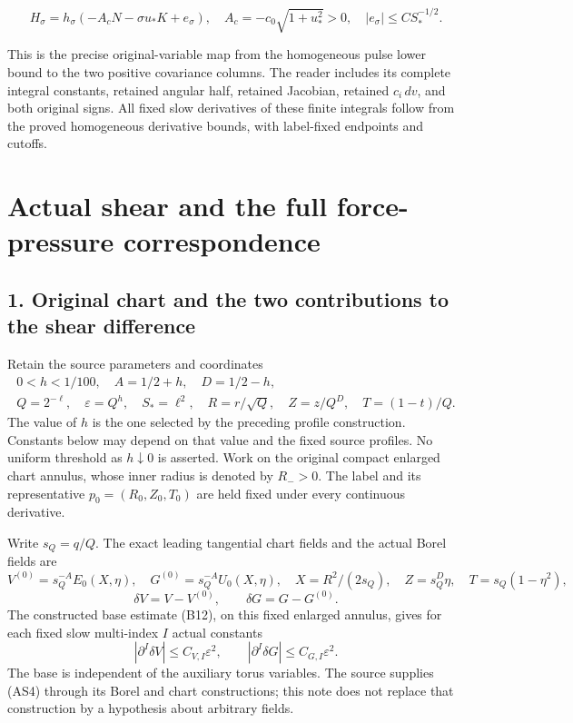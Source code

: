 \documentclass[10pt,a4paper]{article}
\begin{document}
\[
H_\sigma=h_\sigma(-A_cN-\sigma u_*K+e_\sigma),\quad
A_c=-c_0\sqrt{1+u_*^2}>0,\quad |e_\sigma|\le CS_*^{-1/2}.
\]

This is the precise original-variable map from the homogeneous pulse lower bound to the two positive covariance columns. The reader includes its complete integral constants, retained angular half, retained Jacobian, retained \(c_i\,dv\), and both original signs. All fixed slow derivatives of these finite integrals follow from the proved homogeneous derivative bounds, with label-fixed endpoints and cutoffs.

\section{Actual shear and the full force-pressure correspondence}\label{gclosure:actual-shear-and-the-full-force-pressure-correspondence}

\subsection{1. Original chart and the two contributions to the shear difference}\label{gclosure:original-chart-and-the-two-contributions-to-the-shear-difference}

Retain the source parameters and coordinates \[
\begin{gathered}
0<h<1/100,\quad A=1/2+h,\quad D=1/2-h,\\
Q=2^{-\ell},\quad\varepsilon=Q^h,\quad S_*=\ell^2,
\quad R=r/\sqrt Q,\quad Z=z/Q^D,\quad T=(1-t)/Q.
\end{gathered}
\tag{AS1}
\] The value of \(h\) is the one selected by the preceding profile construction. Constants below may depend on that value and the fixed source profiles. No uniform threshold as \(h\downarrow0\) is asserted. Work on the original compact enlarged chart annulus, whose inner radius is denoted by \(R_->0\). The label and its representative \(p_0=(R_0,Z_0,T_0)\) are held fixed under every continuous derivative.

Write \(s_Q=q/Q\). The exact leading tangential chart fields and the actual Borel fields are \[
V^{(0)}=s_Q^{-A}E_0(X,\eta),\quad
G^{(0)}=s_Q^{-A}U_0(X,\eta),\quad
X=R^2/(2s_Q),\quad Z=s_Q^D\eta,\quad T=s_Q(1-\eta^2),
\tag{AS2}
\] \[
\delta V=V-V^{(0)},\qquad \delta G=G-G^{(0)}.
\tag{AS3}
\] The constructed base estimate (B12), on this fixed enlarged annulus, gives for each fixed slow multi-index \(I\) actual constants \[
|\partial^I\delta V|\le C_{V,I}\varepsilon^2,
\qquad |\partial^I\delta G|\le C_{G,I}\varepsilon^2.
\tag{AS4}
\] The base is independent of the auxiliary torus variables. The source supplies (AS4) through its Borel and chart constructions; this note does not replace that construction by a hypothesis about arbitrary fields.
\end{document}
